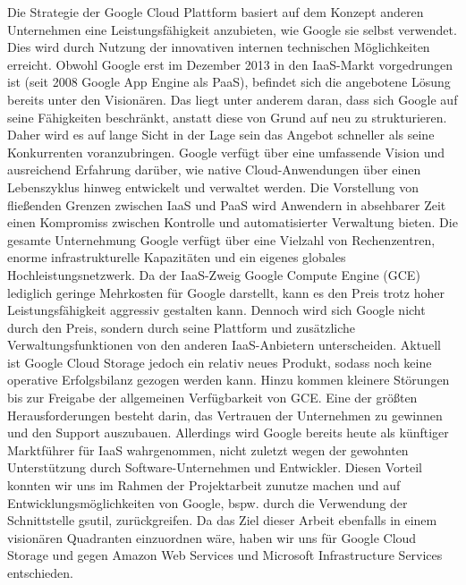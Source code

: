\documentclass[12pt,a4paper,bibliography=totocnumbered,listof=totocnumbered]{scrartcl}
\begin{document}
Die Strategie der Google Cloud Plattform basiert auf dem Konzept anderen Unternehmen eine Leistungsfähigkeit anzubieten, wie Google sie selbst verwendet. Dies wird durch Nutzung der innovativen internen technischen Möglichkeiten erreicht. Obwohl Google erst im Dezember 2013 in den IaaS-Markt vorgedrungen ist (seit 2008 Google App Engine als PaaS), befindet sich die angebotene Lösung bereits unter den Visionären. Das liegt unter anderem daran, dass sich Google auf seine Fähigkeiten beschränkt, anstatt diese von Grund auf neu zu strukturieren. Daher wird es auf lange Sicht in der Lage sein das Angebot schneller als seine Konkurrenten voranzubringen. Google verfügt über eine umfassende Vision und ausreichend Erfahrung darüber, wie native Cloud-Anwendungen über einen Lebenszyklus hinweg entwickelt und verwaltet werden. Die Vorstellung von fließenden Grenzen zwischen IaaS und PaaS wird Anwendern in absehbarer Zeit einen Kompromiss zwischen Kontrolle und automatisierter Verwaltung bieten. Die gesamte Unternehmung Google verfügt über eine Vielzahl von Rechenzentren, enorme infrastrukturelle Kapazitäten und ein eigenes globales Hochleistungsnetzwerk. Da der IaaS-Zweig Google Compute Engine (GCE) lediglich geringe Mehrkosten für Google darstellt, kann es den Preis trotz hoher Leistungsfähigkeit aggressiv gestalten kann. Dennoch wird sich Google nicht durch den Preis, sondern durch seine Plattform und zusätzliche Verwaltungsfunktionen von den anderen IaaS-Anbietern unterscheiden. Aktuell ist Google Cloud Storage jedoch ein relativ neues Produkt, sodass noch keine operative Erfolgsbilanz gezogen werden kann. Hinzu kommen kleinere Störungen bis zur Freigabe der allgemeinen Verfügbarkeit von GCE. Eine der größten Herausforderungen besteht darin, das Vertrauen der Unternehmen zu gewinnen und den Support auszubauen. Allerdings wird Google bereits heute als künftiger Marktführer für IaaS wahrgenommen, nicht zuletzt wegen der gewohnten Unterstützung durch Software-Unternehmen und Entwickler. Diesen Vorteil konnten wir uns im Rahmen der Projektarbeit zunutze machen und auf Entwicklungsmöglichkeiten von Google, bspw. durch die Verwendung der Schnittstelle gsutil, zurückgreifen. Da das Ziel dieser Arbeit ebenfalls in einem visionären Quadranten einzuordnen wäre, haben wir uns für Google Cloud Storage und gegen Amazon Web Services und Microsoft Infrastructure Services entschieden.
\end{document}
